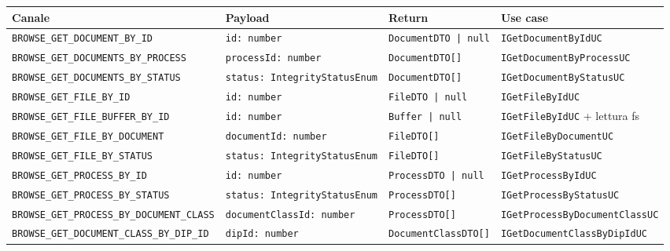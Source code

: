 \begin{table}[H]
  \centering
  \renewcommand{\arraystretch}{1.4}
  \begin{adjustbox}{max width=\textwidth}
  \begin{tabular}{|l|l|l|l|}
    \hline
    \textbf{Canale} & \textbf{Payload} & \textbf{Return} & \textbf{Use case} \\
    \hline
    \texttt{BROWSE\_GET\_DOCUMENT\_BY\_ID}              & \texttt{id: number}                  & \texttt{DocumentDTO | null}      & \texttt{IGetDocumentByIdUC} \\
    \hline
    \texttt{BROWSE\_GET\_DOCUMENTS\_BY\_PROCESS}        & \texttt{processId: number}           & \texttt{DocumentDTO[]}           & \texttt{IGetDocumentByProcessUC} \\
    \hline
    \texttt{BROWSE\_GET\_DOCUMENTS\_BY\_STATUS}         & \texttt{status: IntegrityStatusEnum} & \texttt{DocumentDTO[]}           & \texttt{IGetDocumentByStatusUC} \\
    \hline
    \texttt{BROWSE\_GET\_FILE\_BY\_ID}                  & \texttt{id: number}                  & \texttt{FileDTO | null}          & \texttt{IGetFileByIdUC} \\
    \hline
    \texttt{BROWSE\_GET\_FILE\_BUFFER\_BY\_ID}          & \texttt{id: number}                  & \texttt{Buffer | null}           & \texttt{IGetFileByIdUC} + lettura fs \\
    \hline
    \texttt{BROWSE\_GET\_FILE\_BY\_DOCUMENT}            & \texttt{documentId: number}          & \texttt{FileDTO[]}               & \texttt{IGetFileByDocumentUC} \\
    \hline
    \texttt{BROWSE\_GET\_FILE\_BY\_STATUS}              & \texttt{status: IntegrityStatusEnum} & \texttt{FileDTO[]}               & \texttt{IGetFileByStatusUC} \\
    \hline
    \texttt{BROWSE\_GET\_PROCESS\_BY\_ID}               & \texttt{id: number}                  & \texttt{ProcessDTO | null}       & \texttt{IGetProcessByIdUC} \\
    \hline
    \texttt{BROWSE\_GET\_PROCESS\_BY\_STATUS}           & \texttt{status: IntegrityStatusEnum} & \texttt{ProcessDTO[]}            & \texttt{IGetProcessByStatusUC} \\
    \hline
    \texttt{BROWSE\_GET\_PROCESS\_BY\_DOCUMENT\_CLASS}  & \texttt{documentClassId: number}     & \texttt{ProcessDTO[]}            & \texttt{IGetProcessByDocumentClassUC} \\
    \hline
    \texttt{BROWSE\_GET\_DOCUMENT\_CLASS\_BY\_DIP\_ID}  & \texttt{dipId: number}               & \texttt{DocumentClassDTO[]}      & \texttt{IGetDocumentClassByDipIdUC} \\

\end{tabular}
\end{adjustbox}
\end{table}
